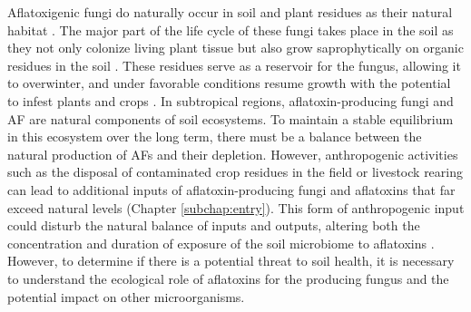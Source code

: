 Aflatoxigenic fungi do naturally occur in soil and plant residues as their natural habitat \citep{horn2003ecology, jaime2004aspergillus, orum1997spatial, accinelli2008aspergillus}. The major part of the life cycle of these fungi takes place in the soil as they not only colonize living plant tissue but also grow saprophytically on organic residues in the soil \citep{abbas2009ecology}. These residues serve as a reservoir for the fungus, allowing it to overwinter, and under favorable conditions resume growth with the potential to infest plants and crops  \citep{horn2003ecology, abbas2009ecology}. In subtropical regions, aflatoxin-producing fungi and AF are natural components of soil ecosystems. To maintain a stable equilibrium in this ecosystem over the long term, there must be a balance between the natural production of AFs and their depletion. However, anthropogenic activities such as the disposal of contaminated crop residues in the field or livestock rearing can lead to additional inputs of aflatoxin-producing fungi and aflatoxins that far exceed natural levels (Chapter \ref{subchap:entry}). This form of anthropogenic input could disturb the natural balance of inputs and outputs, altering both the concentration and duration of exposure of the soil microbiome to aflatoxins \citep{fouche2020aflatoxins}. However, to determine if there is a potential threat to soil health, it is necessary to understand the ecological role of aflatoxins for the producing fungus and the potential impact on other microorganisms. 


